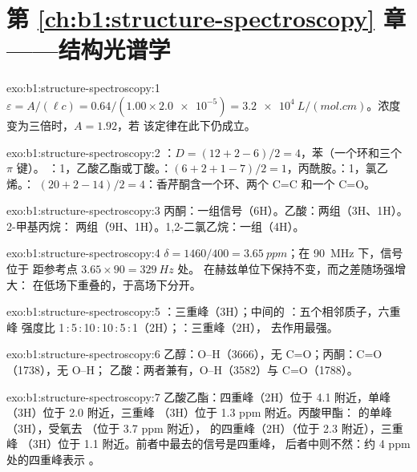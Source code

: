 \section*{第 \ref{ch:b1:structure-spectroscopy} 章——结构光谱学}

\begin{solution}{exo:b1:structure-spectroscopy:1}
$\varepsilon = A/(\ell c) = 0.64/(1.00 \times \num{2.0e-5}) =
\qty{3.2e4}{L/(mol.cm)}$。浓度变为三倍时，$A = 1.92$，若
该定律在此下仍成立。
\end{solution}

\begin{solution}{exo:b1:structure-spectroscopy:2}
：$D = (12 + 2 - 6)/2 = 4$，苯（一个环和三个 $\pi$ 键）。
：1，乙酸乙酯或丁酸。：$(6 + 2 + 1
- 7)/2 = 1$，丙酰胺。：1，氯乙烯。：
$(20 + 2 - 14)/2 = 4$：香芹酮含一个环、两个 C=C 和一个 C=O。
\end{solution}

\begin{solution}{exo:b1:structure-spectroscopy:3}
丙酮：一组信号（6H）。乙酸：两组（3H、1H）。2-甲基丙烷：
两组（9H、1H）。1,2-二氯乙烷：一组（4H）。
\end{solution}

\begin{solution}{exo:b1:structure-spectroscopy:4}
$\delta = 1460/400 = \qty{3.65}{ppm}$；在 \qty{90}{MHz} 下，信号位于
距参考点 $3.65 \times 90 = \qty{329}{Hz}$ 处。
在赫兹单位下保持不变，而之差随场强增大：
在低场下重叠的，于高场下分开。
\end{solution}

\begin{solution}{exo:b1:structure-spectroscopy:5}
：三重峰（3H）；中间的 ：五个相邻质子，六重峰
强度比 1\,:\,5\,:\,10\,:\,10\,:\,5\,:\,1（2H）；：三重峰（2H），
去作用最强。
\end{solution}

\begin{solution}{exo:b1:structure-spectroscopy:6}
乙醇：O--H（3666），无 C=O；丙酮：C=O（1738），无 O--H；
乙酸：两者兼有，O--H（3582）与 C=O（1788）。
\end{solution}

\begin{solution}{exo:b1:structure-spectroscopy:7}
乙酸乙酯：四重峰（2H）位于 4.1 附近，单峰（3H）位于 2.0 附近，三重峰
（3H）位于 1.3 ppm 附近。丙酸甲酯： 的单峰（3H），受氧去
（位于 3.7 ppm 附近）， 的四重峰（2H）（位于 2.3 附近），三重峰
（3H）位于 1.1 附近。前者中最去的信号是四重峰，
后者中则不然：约 4 ppm 处的四重峰表示 。
\end{solution}

